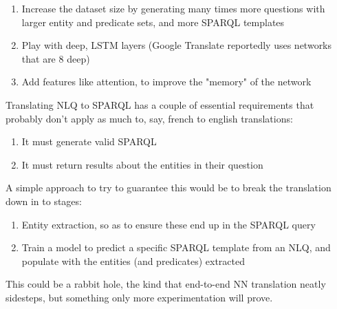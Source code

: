 \documentclass[12pt]{article}
\begin{document}
\begin{enumerate}
  \item 
    Increase the dataset size by generating many times more questions
    with larger entity and predicate sets, and more SPARQL templates
  \item 
    Play with deep, LSTM layers (Google Translate reportedly uses networks that are 8 deep) 
    \cite{wu2016google}
  \item
    Add features like attention, to improve the "memory" of the network \cite{luong2015effective}
\end{enumerate}

Translating NLQ to SPARQL has a couple of essential requirements that 
probably don't apply as much to, say, french to english translations:

\begin{enumerate}
  \item It must generate valid SPARQL
  \item It must return results about the entities in their question
\end{enumerate}

A simple approach to try to guarantee this would be to break the 
translation down in to stages:

\begin{enumerate}
  \item 
    Entity extraction, so as to ensure these end up in the SPARQL query
  \item 
    Train a model to predict a specific SPARQL template from an NLQ, 
    and populate with the entities (and predicates) extracted
\end{enumerate}

This could be a rabbit hole, the kind that end-to-end NN translation
neatly sidesteps, but something only more experimentation will prove.

\printbibliography
   
\end{document}
